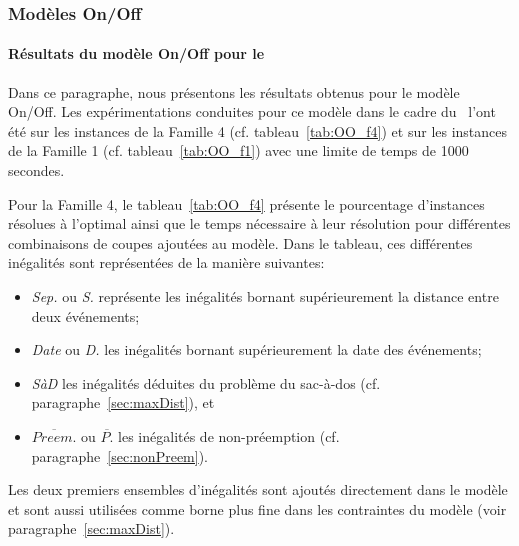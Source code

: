 \subsubsection{Modèles On/Off}

\paragraph{Résultats du modèle On/Off pour le \CECSP}
Dans ce paragraphe, nous présentons les résultats obtenus pour le
modèle On/Off. Les expérimentations conduites pour ce modèle dans le
cadre du \CECSP~l'ont été
sur les instances de la Famille 4 (cf. tableau~\ref{tab:OO_f4}) et sur les
instances de la Famille 1 (cf. tableau~\ref{tab:OO_f1}) avec une
limite de temps de 1000 secondes.  

Pour la Famille 4, le tableau~\ref{tab:OO_f4} présente le pourcentage
d'instances résolues à l'optimal ainsi que le temps nécessaire à leur 
résolution pour différentes combinaisons de coupes ajoutées au
modèle. Dans le tableau, ces différentes inégalités sont représentées
de la manière suivantes: 
\begin{itemize}
\item {\it Sep.} ou {\it S.} représente les inégalités
 bornant supérieurement la distance entre deux événements;
\item {\it Date} ou {\it D.} les inégalités bornant supérieurement la
  date des événements;
\item {\it SàD} les inégalités déduites du problème du sac-à-dos
  (cf. paragraphe~\ref{sec:maxDist}), et  
\item {\it $\overline{Preem.}$} ou {\it $\overline{P.}$} les
  inégalités de non-préemption (cf. paragraphe~\ref{sec:nonPreem}).
\end{itemize}
 Les deux premiers ensembles d'inégalités sont ajoutés directement
 dans le modèle et sont aussi utilisées comme borne plus fine dans les
 contraintes du modèle (voir paragraphe~\ref{sec:maxDist}).


